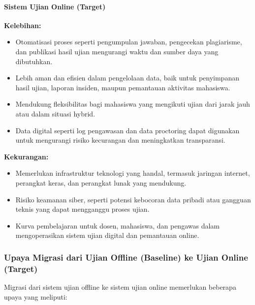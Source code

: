 \paragraph{Sistem Ujian Online (Target)}
\textbf{Kelebihan:}
\begin{itemize}
	\item Otomatisasi proses seperti pengumpulan jawaban, pengecekan plagiarisme, dan publikasi hasil ujian mengurangi waktu dan sumber daya yang dibutuhkan.
	\item Lebih aman dan efisien dalam pengelolaan data, baik untuk penyimpanan hasil ujian, laporan insiden, maupun pemantauan aktivitas mahasiswa.
	\item Mendukung fleksibilitas bagi mahasiswa yang mengikuti ujian dari jarak jauh atau dalam situasi hybrid.
	\item Data digital seperti log pengawasan dan data proctoring dapat digunakan untuk mengurangi risiko kecurangan dan meningkatkan transparansi.
\end{itemize}

\textbf{Kekurangan:}
\begin{itemize}
	\item Memerlukan infrastruktur teknologi yang handal, termasuk jaringan internet, perangkat keras, dan perangkat lunak yang mendukung.
	\item Risiko keamanan siber, seperti potensi kebocoran data pribadi atau gangguan teknis yang dapat mengganggu proses ujian.
	\item Kurva pembelajaran untuk dosen, mahasiswa, dan pengawas dalam mengoperasikan sistem ujian digital dan pemantauan online.
\end{itemize}

\subsubsection{Upaya Migrasi dari Ujian Offline (Baseline) ke Ujian Online (Target)}

Migrasi dari sistem ujian offline ke sistem ujian online memerlukan beberapa upaya yang meliputi:


